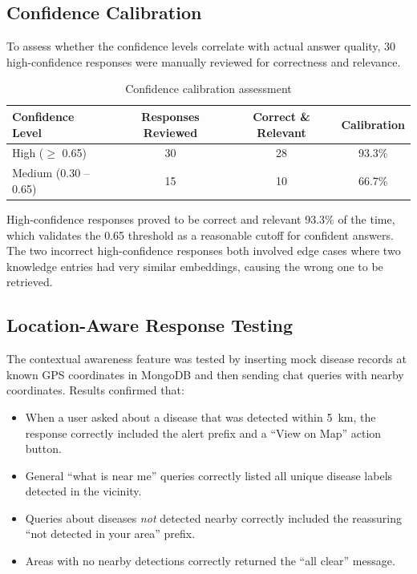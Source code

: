 \subsection{Confidence Calibration}

To assess whether the confidence levels correlate with actual answer quality, 30 high-confidence responses were manually reviewed for correctness and relevance.

\begin{table}[H]
\centering
\caption{Confidence calibration assessment}
\label{tab:confidence_calibration}
\begin{tabular}{|l|c|c|c|}
\hline
\textbf{Confidence Level} & \textbf{Responses Reviewed} & \textbf{Correct \& Relevant} & \textbf{Calibration} \\
\hline
High ($\geq$ 0.65) & 30 & 28 & 93.3\% \\
\hline
Medium (0.30 -- 0.65) & 15 & 10 & 66.7\% \\
\hline
\end{tabular}
\end{table}

High-confidence responses proved to be correct and relevant 93.3\% of the time, which validates the 0.65 threshold as a reasonable cutoff for confident answers. The two incorrect high-confidence responses both involved edge cases where two knowledge entries had very similar embeddings, causing the wrong one to be retrieved.

\subsection{Location-Aware Response Testing}

The contextual awareness feature was tested by inserting mock disease records at known GPS coordinates in MongoDB and then sending chat queries with nearby coordinates. Results confirmed that:

\begin{itemize}
    \item When a user asked about a disease that was detected within 5~km, the response correctly included the alert prefix and a ``View on Map'' action button.
    \item General ``what is near me'' queries correctly listed all unique disease labels detected in the vicinity.
    \item Queries about diseases \textit{not} detected nearby correctly included the reassuring ``not detected in your area'' prefix.
    \item Areas with no nearby detections correctly returned the ``all clear'' message.
\end{itemize}


